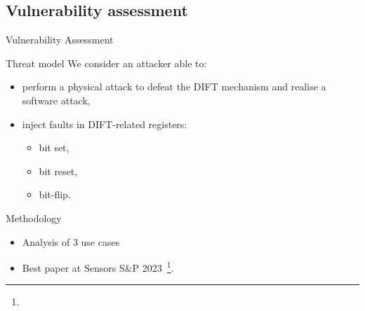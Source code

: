 \subsection{Vulnerability assessment}
\begin{frame}{Vulnerability Assessment}
    \begin{block}{Threat model}
        We consider an attacker able to:
        \begin{itemize}
            \item perform a physical attack to defeat the DIFT mechanism and realise a software attack,
            \item inject faults in DIFT-related registers:
                  \begin{itemize}
                      \item bit set,
                      \item bit reset,
                      \item bit-flip.
                  \end{itemize}
        \end{itemize}
    \end{block}

    \begin{block}{Methodology}
        \begin{itemize}
            \item Analysis of 3 use cases%
            \item Best paper at Sensors S\&P 2023~\footnote[frame]{\tiny{}}.
        \end{itemize}
    \end{block}
\end{frame}
